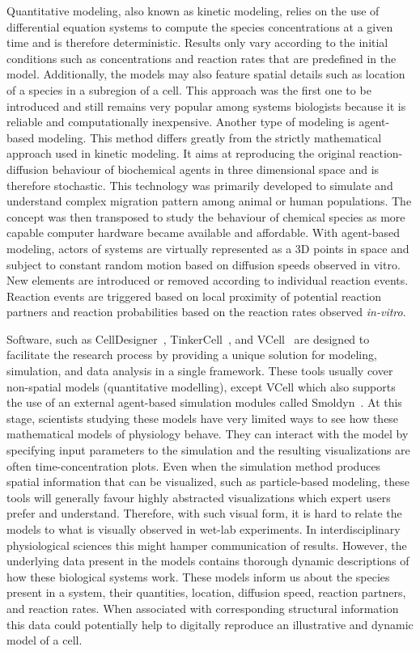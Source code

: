 Quantitative modeling, also known as kinetic modeling, relies on the use of differential equation systems to compute the species concentrations at a given time and is therefore deterministic.
Results only vary according to the initial conditions such as concentrations and reaction rates that are predefined in the model.
Additionally, the models may also feature spatial details such as location of a species in a subregion of a cell.
This approach was the first one to be introduced and still remains very popular among systems biologists because it is reliable and computationally inexpensive.
Another type of modeling is agent-based modeling.
This method differs greatly from the strictly mathematical approach used in kinetic modeling.
It aims at reproducing the original reaction-diffusion behaviour of biochemical agents in three dimensional space and is therefore stochastic.
This technology was primarily developed to simulate and understand complex migration pattern among animal or human populations.
The concept was then transposed to study the behaviour of chemical species as more capable computer hardware became available and affordable.
With agent-based modeling, actors of systems are virtually represented as a 3D points in space and subject to constant random motion based on diffusion speeds observed in vitro.
New elements are introduced or removed according to individual reaction events.
Reaction events are triggered based on local proximity of potential reaction partners and reaction probabilities based on the reaction rates observed \textit{in-vitro}.

Software, such as CellDesigner~\cite{funahashi2003celldesigner}, TinkerCell~\cite{chandran2009tinkercell}, and VCell~\cite{moraru2008virtual} are designed to facilitate the research process by providing a unique solution for modeling, simulation, and data analysis in a single framework.
These tools usually cover non-spatial models (quantitative modelling), except VCell which also supports the use of an external agent-based simulation modules called Smoldyn~\cite{andrews2010detailed}.
At this stage, scientists studying these models have very limited ways to see how these mathematical models of physiology behave.
They can interact with the model by specifying input parameters to the simulation and the resulting visualizations are often time-concentration plots.
Even when the simulation method produces spatial information that can be visualized, such as particle-based modeling, these tools will generally favour highly abstracted visualizations which expert users prefer and understand.
Therefore, with such visual form, it is hard to relate the models to what is visually observed in wet-lab experiments. 
In interdisciplinary physiological sciences this might hamper communication of results. 
However, the underlying data present in the models contains thorough dynamic descriptions of how these biological systems work.
These models inform us about the species present in a system, their quantities, location, diffusion speed, reaction partners, and reaction rates.
When associated with corresponding structural information this data could potentially help to digitally reproduce an illustrative and dynamic model of a cell.

